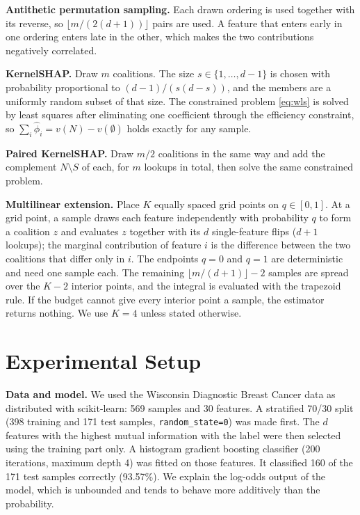 \documentclass[conference]{IEEEtran}
\begin{document}
\textbf{Antithetic permutation sampling.} Each drawn ordering is used together with its reverse, so $\lfloor m/(2(d+1))\rfloor$ pairs are used. A feature that enters early in one ordering enters late in the other, which makes the two contributions negatively correlated.

\textbf{KernelSHAP.} Draw $m$ coalitions. The size $s\in\{1,\dots,d-1\}$ is chosen with probability proportional to $(d-1)/(s(d-s))$, and the members are a uniformly random subset of that size. The constrained problem \eqref{eq:wls} is solved by least squares after eliminating one coefficient through the efficiency constraint, so $\sum_i\hat\phi_i=v(N)-v(\emptyset)$ holds exactly for any sample.

\textbf{Paired KernelSHAP.} Draw $m/2$ coalitions in the same way and add the complement $N\setminus S$ of each, for $m$ lookups in total, then solve the same constrained problem.

\textbf{Multilinear extension.} Place $K$ equally spaced grid points on $q\in[0,1]$. At a grid point, a sample draws each feature independently with probability $q$ to form a coalition $z$ and evaluates $z$ together with its $d$ single-feature flips ($d+1$ lookups); the marginal contribution of feature $i$ is the difference between the two coalitions that differ only in $i$. The endpoints $q=0$ and $q=1$ are deterministic and need one sample each. The remaining $\lfloor m/(d+1)\rfloor-2$ samples are spread over the $K-2$ interior points, and the integral is evaluated with the trapezoid rule. If the budget cannot give every interior point a sample, the estimator returns nothing. We use $K=4$ unless stated otherwise.

\section{Experimental Setup}
\label{sec:setup}

\textbf{Data and model.} We used the Wisconsin Diagnostic Breast Cancer data \cite{street1993} as distributed with scikit-learn: 569 samples and 30 features. A stratified 70/30 split (398 training and 171 test samples, \texttt{random\_state=0}) was made first. The $d$ features with the highest mutual information with the label were then selected using the training part only. A histogram gradient boosting classifier (200 iterations, maximum depth 4) was fitted on those features. It classified 160 of the 171 test samples correctly (93.57\%). We explain the log-odds output of the model, which is unbounded and tends to behave more additively than the probability.
\end{document}
